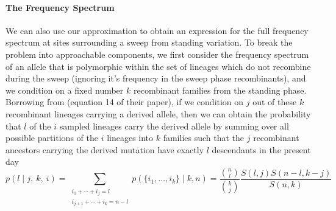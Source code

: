 \documentclass[a4paper,10pt]{article}
\begin{document}
\paragraph{The Frequency Spectrum} We can also use our approximation to obtain an expression for the full frequency spectrum at sites surrounding a sweep from standing variation. To break the problem into approachable components, we first consider the frequency spectrum of an allele that is polymorphic within the set of lineages which do not recombine during the sweep (ignoring it's frequency in the sweep phase recombinants), and we condition on a fixed number $k$ recombinant families from the standing phase. Borrowing from \cite{Pennings2006} (equation 14 of their paper), if we condition on $j$ out of these $k$ recombinant lineages carrying a derived allele, then we can obtain the probability that $l$ of the $i$ sampled lineages carry the derived allele by summing over all possible partitions of the $i$ lineages into $k$ families such that the $j$ recombinant ancestors carrying the derived mutation have exactly $l$ descendants in the present day
\begin{equation}
p(l \mid j, ~k,~i) = \sum_{\substack{i_1+\cdots +i_j=l \\i_{j+1}+\cdots + i_k=n-l}} p(\{i_1,\dots,i_k\} \mid k, n) = \frac{ {n \choose l} }{ {k \choose j} }\frac{ S(l,j)  S(n-l,k-j)  }{ S(n,k) } \label{ESF_gives_freq_spec}
\end{equation}
\end{document}

